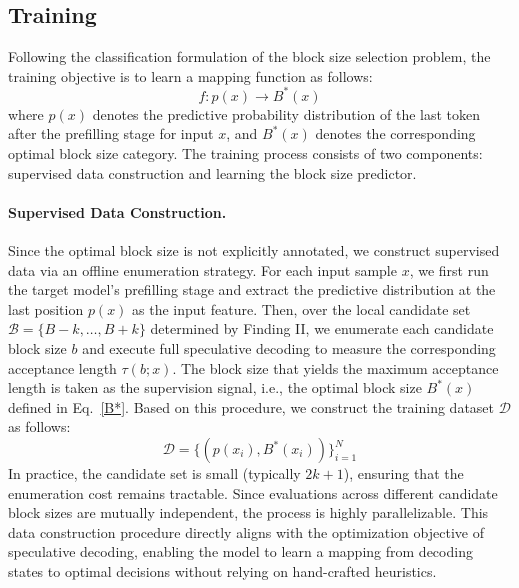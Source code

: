 \documentclass{llmxive}
\begin{document}
\subsection{Training}
Following the classification formulation of the block size selection problem, the training objective is to learn a mapping function as follows:
\begin{equation}
f : p(x) \rightarrow B^*(x)
\end{equation}
where $p(x)$ denotes the predictive probability distribution of the last token after the prefilling stage for input $x$, and $B^*(x)$ denotes the corresponding optimal block size category. The training process consists of two components: supervised data construction and learning the block size predictor.


\paragraph{Supervised Data Construction.}
Since the optimal block size is not explicitly annotated, we construct supervised data via an offline enumeration strategy. For each input sample $x$, we first run the target model’s prefilling stage and extract the predictive distribution at the last position $p(x)$ as the input feature. Then, over the local candidate set $\mathcal{B} = \{B - k, \ldots, B + k\}$ determined by Finding II, we enumerate each candidate block size $b$ and execute full speculative decoding to measure the corresponding acceptance length $\tau(b; x)$. The block size that yields the maximum acceptance length is taken as the supervision signal, i.e., the optimal block size $B^*(x)$ defined in Eq.~\ref{B*}. Based on this procedure, we construct the training dataset $\mathcal{D}$ as follows:
\begin{equation}
\mathcal{D} = \{(p(x_i), B^*(x_i))\}_{i=1}^N
\end{equation}
In practice, the candidate set is small (typically $2k + 1 $), ensuring that the enumeration cost remains tractable. Since evaluations across different candidate block sizes are mutually independent, the process is highly parallelizable. This data construction procedure directly aligns with the optimization objective of speculative decoding, enabling the model to learn a mapping from decoding states to optimal decisions without relying on hand-crafted heuristics.
\end{document}
